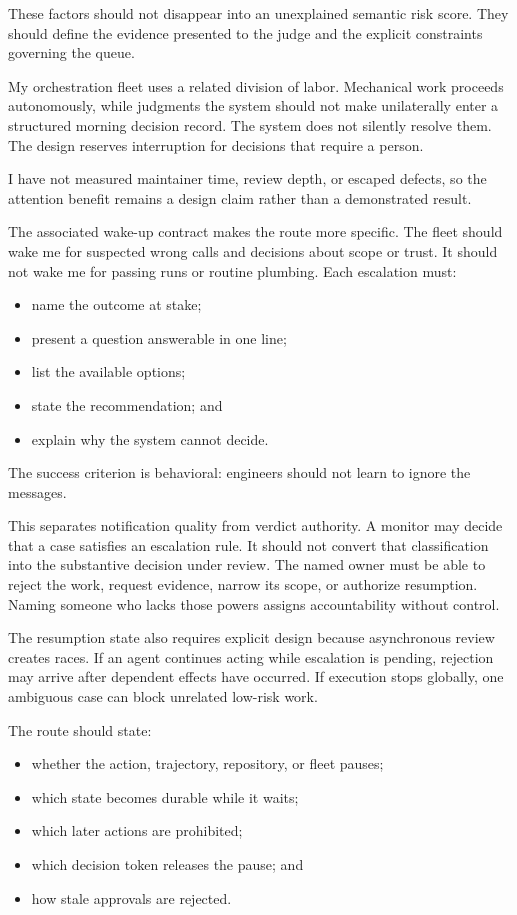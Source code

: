 These factors should not disappear into an unexplained semantic risk score. They should define the evidence presented to the judge and the explicit constraints governing the queue.

My orchestration fleet uses a related division of labor. Mechanical work proceeds autonomously, while judgments the system should not make unilaterally enter a structured morning decision record. The system does not silently resolve them. The design reserves interruption for decisions that require a person.

I have not measured maintainer time, review depth, or escaped defects, so the attention benefit remains a design claim rather than a demonstrated result.

The associated wake-up contract makes the route more specific. The fleet should wake me for suspected wrong calls and decisions about scope or trust. It should not wake me for passing runs or routine plumbing. Each escalation must:

\begin{itemize}
\tightlist
\item
  name the outcome at stake;
\item
  present a question answerable in one line;
\item
  list the available options;
\item
  state the recommendation; and
\item
  explain why the system cannot decide.
\end{itemize}

The success criterion is behavioral: engineers should not learn to ignore the messages.

This separates notification quality from verdict authority. A monitor may decide that a case satisfies an escalation rule. It should not convert that classification into the substantive decision under review. The named owner must be able to reject the work, request evidence, narrow its scope, or authorize resumption. Naming someone who lacks those powers assigns accountability without control.

The resumption state also requires explicit design because asynchronous review creates races. If an agent continues acting while escalation is pending, rejection may arrive after dependent effects have occurred. If execution stops globally, one ambiguous case can block unrelated low-risk work.

The route should state:

\begin{itemize}
\tightlist
\item
  whether the action, trajectory, repository, or fleet pauses;
\item
  which state becomes durable while it waits;
\item
  which later actions are prohibited;
\item
  which decision token releases the pause; and
\item
  how stale approvals are rejected.
\end{itemize}

